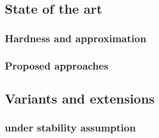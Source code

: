 \subsection{State of the art}
\label{sub:state_of_the_art}

\subsubsection{Hardness and approximation}
\label{ssub:cc_harness_approx}

\subsubsection{Proposed approaches}
\label{ssub:cc_methods}


\subsection{Variants and extensions}
\label{sub:variants_and_extensions}


\subsubsection{\pcc{} under stability assumption}
\label{ssub:cc_under_stability_assumption}


\iffalse
\subsubsection{Parallel \pcc{}}
\label{ssub:parallel_cc}

\subsection{Empirical evaluation?}
\label{sub:cc_empiracal_evaluation}
\fi
